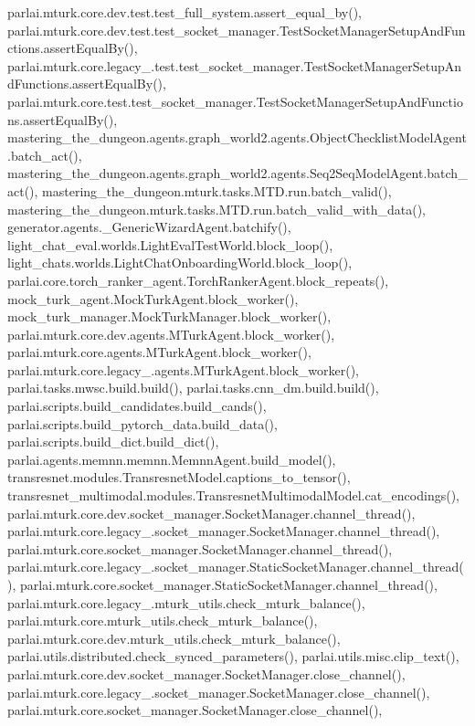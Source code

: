 parlai.\+mturk.\+core.\+dev.\+test.\+test\+\_\+full\+\_\+system.\+assert\+\_\+equal\+\_\+by(), parlai.\+mturk.\+core.\+dev.\+test.\+test\+\_\+socket\+\_\+manager.\+Test\+Socket\+Manager\+Setup\+And\+Functions.\+assert\+Equal\+By(), parlai.\+mturk.\+core.\+legacy\+\_.\+test.\+test\+\_\+socket\+\_\+manager.\+Test\+Socket\+Manager\+Setup\+And\+Functions.\+assert\+Equal\+By(), parlai.\+mturk.\+core.\+test.\+test\+\_\+socket\+\_\+manager.\+Test\+Socket\+Manager\+Setup\+And\+Functions.\+assert\+Equal\+By(), mastering\+\_\+the\+\_\+dungeon.\+agents.\+graph\+\_\+world2.\+agents.\+Object\+Checklist\+Model\+Agent.\+batch\+\_\+act(), mastering\+\_\+the\+\_\+dungeon.\+agents.\+graph\+\_\+world2.\+agents.\+Seq2\+Seq\+Model\+Agent.\+batch\+\_\+act(), mastering\+\_\+the\+\_\+dungeon.\+mturk.\+tasks.\+M\+T\+D.\+run.\+batch\+\_\+valid(), mastering\+\_\+the\+\_\+dungeon.\+mturk.\+tasks.\+M\+T\+D.\+run.\+batch\+\_\+valid\+\_\+with\+\_\+data(), generator.\+agents.\+\_\+\+Generic\+Wizard\+Agent.\+batchify(), light\+\_\+chat\+\_\+eval.\+worlds.\+Light\+Eval\+Test\+World.\+block\+\_\+loop(), light\+\_\+chats.\+worlds.\+Light\+Chat\+Onboarding\+World.\+block\+\_\+loop(), parlai.\+core.\+torch\+\_\+ranker\+\_\+agent.\+Torch\+Ranker\+Agent.\+block\+\_\+repeats(), mock\+\_\+turk\+\_\+agent.\+Mock\+Turk\+Agent.\+block\+\_\+worker(), mock\+\_\+turk\+\_\+manager.\+Mock\+Turk\+Manager.\+block\+\_\+worker(), parlai.\+mturk.\+core.\+dev.\+agents.\+M\+Turk\+Agent.\+block\+\_\+worker(), parlai.\+mturk.\+core.\+agents.\+M\+Turk\+Agent.\+block\+\_\+worker(), parlai.\+mturk.\+core.\+legacy\+\_.\+agents.\+M\+Turk\+Agent.\+block\+\_\+worker(), parlai.\+tasks.\+mwsc.\+build.\+build(), parlai.\+tasks.\+cnn\+\_\+dm.\+build.\+build(), parlai.\+scripts.\+build\+\_\+candidates.\+build\+\_\+cands(), parlai.\+scripts.\+build\+\_\+pytorch\+\_\+data.\+build\+\_\+data(), parlai.\+scripts.\+build\+\_\+dict.\+build\+\_\+dict(), parlai.\+agents.\+memnn.\+memnn.\+Memnn\+Agent.\+build\+\_\+model(), transresnet.\+modules.\+Transresnet\+Model.\+captions\+\_\+to\+\_\+tensor(), transresnet\+\_\+multimodal.\+modules.\+Transresnet\+Multimodal\+Model.\+cat\+\_\+encodings(), parlai.\+mturk.\+core.\+dev.\+socket\+\_\+manager.\+Socket\+Manager.\+channel\+\_\+thread(), parlai.\+mturk.\+core.\+legacy\+\_.\+socket\+\_\+manager.\+Socket\+Manager.\+channel\+\_\+thread(), parlai.\+mturk.\+core.\+socket\+\_\+manager.\+Socket\+Manager.\+channel\+\_\+thread(), parlai.\+mturk.\+core.\+legacy\+\_.\+socket\+\_\+manager.\+Static\+Socket\+Manager.\+channel\+\_\+thread(), parlai.\+mturk.\+core.\+socket\+\_\+manager.\+Static\+Socket\+Manager.\+channel\+\_\+thread(), parlai.\+mturk.\+core.\+legacy\+\_.\+mturk\+\_\+utils.\+check\+\_\+mturk\+\_\+balance(), parlai.\+mturk.\+core.\+mturk\+\_\+utils.\+check\+\_\+mturk\+\_\+balance(), parlai.\+mturk.\+core.\+dev.\+mturk\+\_\+utils.\+check\+\_\+mturk\+\_\+balance(), parlai.\+utils.\+distributed.\+check\+\_\+synced\+\_\+parameters(), parlai.\+utils.\+misc.\+clip\+\_\+text(), parlai.\+mturk.\+core.\+dev.\+socket\+\_\+manager.\+Socket\+Manager.\+close\+\_\+channel(), parlai.\+mturk.\+core.\+legacy\+\_.\+socket\+\_\+manager.\+Socket\+Manager.\+close\+\_\+channel(), parlai.\+mturk.\+core.\+socket\+\_\+manager.\+Socket\+Manager.\+close\+\_\+channel(), 